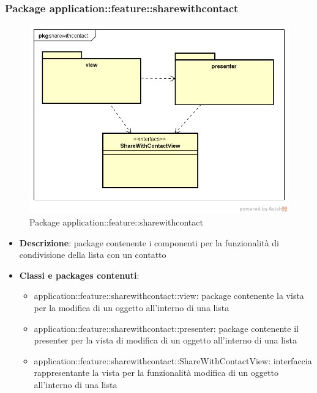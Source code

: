 \subsubsection{Package application::feature::sharewithcontact}
\label{Package application::feature::sharewithcontact}
\begin{figure}[H]
	\centering
	\includegraphics[scale=0.5]{Sezioni/Packages/Application/share_with_contact.png}
	\caption{Package application::feature::sharewithcontact}
\end{figure}
\begin{itemize}
	\item \textbf{Descrizione}: package contenente i componenti per la funzionalità di condivisione della lista con un contatto
	\item \textbf{Classi e packages contenuti}:
	\begin{itemize}
	\item application::feature::sharewithcontact::view: package contenente la vista per la modifica di un oggetto all'interno di una lista
	\item application::feature::sharewithcontact::presenter: package contenente il presenter per la vista di modifica di un oggetto all'interno di una lista
	\item application::feature::sharewithcontact::ShareWithContactView: interfaccia rappresentante la vista per la funzionalità modifica di un oggetto all'interno di una lista
	\end{itemize}
\end{itemize}

